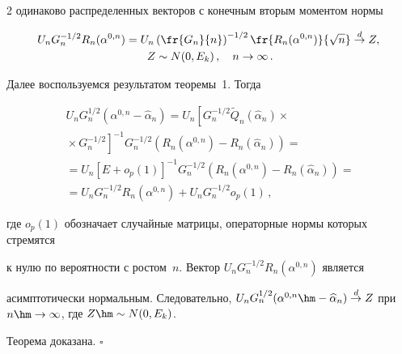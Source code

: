 \begin{multicols}{2}
одинаково распределенных векторов с конечным вторым моментом нормы


\begin{multline*}


\hspace*{-3pt}U_nG_n^{-1/2}R_n(\alpha^{0,n})=U_n\left(\fr{G_n}{n}\right)^{-1/2}


\fr{R_n(\alpha^{0,n})}{\sqrt{n}}\stackrel{d}\rightarrow Z,\\  


Z\sim N(0,E_k)\,, \quad


n\rightarrow\infty\,.




\end{multline*}


Далее воспользуемся результатом теоремы~1. Тогда


\begin{multline*}


U_nG_n^{1/2}(\alpha^{0,n}-\widehat{\alpha}_n)=


U_n\left[G_n^{-1/2}\widetilde{Q}_n(\widehat{\alpha}_n)\times{}\right.\\


\left.{}\times G_n^{-1/2}\right]^{-1}G_n^{-1/2}


\left(R_n(\alpha^{0,n})-R_n(\widehat{\alpha}_n)\right)={}\\


{}=U_n\left[E+o_p(1)\right]^{-1}G_n^{-1/2}\left(R_n(\alpha^{0,n})-R_n(\widehat{\alpha}_n)\right)={}\\


{}=U_nG_n^{-1/2}R_n(\alpha^{0,n})+U_nG_n^{-1/2}o_p(1)\,,




\end{multline*}


где $o_p(1)$ обозначает случайные матрицы, операторные нормы которых стремятся 


к нулю по вероятности с ростом~$n$. Вектор $U_nG_n^{-1/2}R_n(\alpha^{0,n})$ является 


асимптотически нормальным. Следовательно, $U_nG_n^{1/2}(\alpha^{0,n}\hm-\widehat{\alpha}_n)


\stackrel{d}{\rightarrow}Z$ при $n\hm\rightarrow\infty$, где $Z\hm\sim N(0,E_k)$. 


Теорема доказана. \hfill $\square$





\medskip






\end{multicols}
